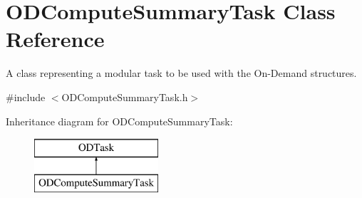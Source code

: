 \hypertarget{class_o_d_compute_summary_task}{}\section{O\+D\+Compute\+Summary\+Task Class Reference}
\label{class_o_d_compute_summary_task}


A class representing a modular task to be used with the On-\/\+Demand structures.  




{\ttfamily \#include $<$O\+D\+Compute\+Summary\+Task.\+h$>$}

Inheritance diagram for O\+D\+Compute\+Summary\+Task\+:\begin{figure}[H]
\begin{center}
\leavevmode
\includegraphics[height=2.000000cm]{class_o_d_compute_summary_task}
\end{center}
\end{figure}
